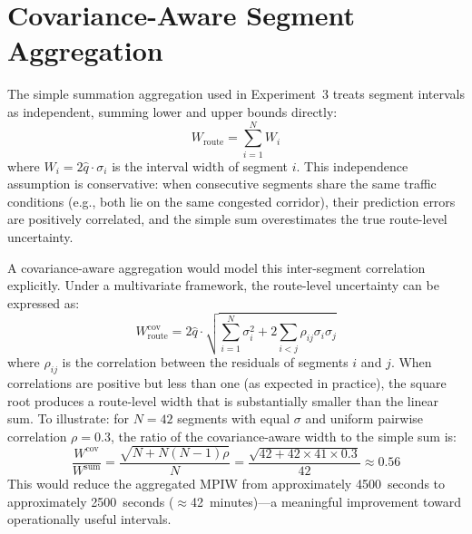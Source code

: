 \section{Covariance-Aware Segment Aggregation}
\label{sec:fw_covariance}

The simple summation aggregation used in Experiment~3 treats segment intervals as independent, summing lower and upper bounds directly:
\begin{equation}
    W_{\text{route}} = \sum_{i=1}^{N} W_i
\end{equation}
where $W_i = 2 \hat{q} \cdot \sigma_i$ is the interval width of segment $i$. This independence assumption is conservative: when consecutive segments share the same traffic conditions (e.g., both lie on the same congested corridor), their prediction errors are positively correlated, and the simple sum overestimates the true route-level uncertainty.

A covariance-aware aggregation would model this inter-segment correlation explicitly. Under a multivariate framework, the route-level uncertainty can be expressed as:
\begin{equation}
    W_{\text{route}}^{\text{cov}} = 2 \hat{q} \cdot \sqrt{\sum_{i=1}^{N} \sigma_i^2 + 2 \sum_{i < j} \rho_{ij} \sigma_i \sigma_j}
    \label{eq:cov_aggregation}
\end{equation}
where $\rho_{ij}$ is the correlation between the residuals of segments $i$ and $j$. When correlations are positive but less than one (as expected in practice), the square root produces a route-level width that is substantially smaller than the linear sum. To illustrate: for $N = 42$ segments with equal $\sigma$ and uniform pairwise correlation $\rho = 0.3$, the ratio of the covariance-aware width to the simple sum is:
\begin{equation}
    \frac{W^{\text{cov}}}{W^{\text{sum}}} = \frac{\sqrt{N + N(N-1)\rho}}{N} = \frac{\sqrt{42 + 42 \times 41 \times 0.3}}{42} \approx 0.56
\end{equation}
This would reduce the aggregated MPIW from approximately 4500~seconds to approximately 2500~seconds ($\approx$42~minutes)---a meaningful improvement toward operationally useful intervals.

